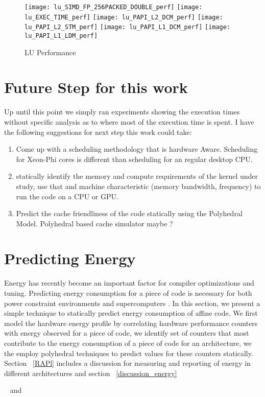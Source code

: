 \documentclass{article}
\begin{document}
\graphicspath{{./latexgraphs/}}

\begin{figure}[h]
\centering
\texttt{[image: lu\_SIMD\_FP\_256PACKED\_DOUBLE\_perf]}
\texttt{[image: lu\_EXEC\_TIME\_perf]}
\texttt{[image: lu\_PAPI\_L2\_DCM\_perf]}
\texttt{[image: lu\_PAPI\_L2\_STM\_perf]}
\texttt{[image: lu\_PAPI\_L1\_DCM\_perf]}
\texttt{[image: lu\_PAPI\_L1\_LDM\_perf]}
\caption{LU Performance}
\label{lu_perf} %
\end{figure} 

\section{Future Step for this work}
Up until this point we simply ran experiments showing the execution times without specific analysis as to where most of 
the execution time is spent. I have the following suggestions for next step this work could take:  

\begin{enumerate}
  \item Come up with a scheduling methodology that is hardware Aware. Scheduling for Xeon-Phi cores is different than scheduling 
        for an regular desktop CPU.
  \item statically identify the memory and compute requirements of the kernel under study, use that and machine characteristic (memory 
        bandwidth, frequency) to run the code on a CPU or GPU.
  \item Predict the cache friendliness of the code statically using the Polyhedral Model. Polyhedral based cache simulator maybe ?   
\end{enumerate}


\section{Predicting Energy}
Energy has recently become an important factor for compiler optimizations and tuning. Predicting energy consumption for a piece of code 
is necessary for both power constraint environments and supercomputers . In this section, we present a simple technique 
to statically predict energy consumption of affine code. We first model the hardware energy profile by correlating hardware performance
counters with energy observed for a piece of code, we identify set of counters that most contribute to the energy consumption of a piece of
code for an architecture, we the employ polyhedral techniques to predict values for these counters statically. Section ~\ref{RAPl} includes
a discussion for measuring and reporting of energy in different architectures  and section ~\ref{discussion_energy} 

~\cite{baskaran2008compiler} and ~\cite{bondhugula2008practical}

{}

\end{document}
